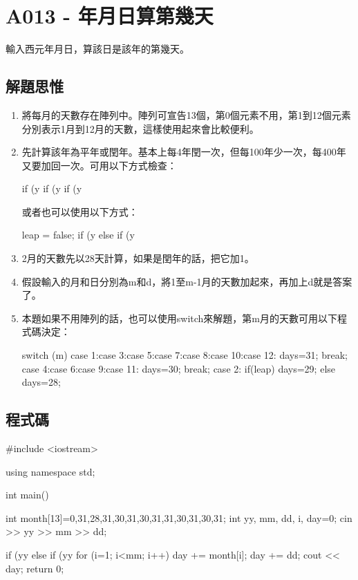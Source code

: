 \section{A013 - 年月日算第幾天}
輸入西元年月日，算該日是該年的第幾天。

\subsection{解題思惟}
\begin{enumerate}
	\item 將每月的天數存在陣列中。陣列可宣告13個，第0個元素不用，第1到12個元素分別表示1月到12月的天數，這樣使用起來會比較便利。
	\item 先計算該年為平年或閏年。基本上每4年閏一次，但每100年少一次，每400年又要加回一次。可用以下方式檢查：
	\begin{inside}
	if (y%
	if (y%
	if (y%
	\end{inside}
	或者也可以使用以下方式：
	\begin{inside}
	leap = false;
	if (y%
	else if (y%
	\end{inside}
	\item 2月的天數先以28天計算，如果是閏年的話，把它加1。
	\item 假設輸入的月和日分別為m和d，將1至m-1月的天數加起來，再加上d就是答案了。
	\item 本題如果不用陣列的話，也可以使用switch來解題，第m月的天數可用以下程式碼決定：
	\begin{inside}
	switch (m) {
	case 1:case 3:case 5:case 7:case 8:case 10:case 12: days=31; break;
	case 4:case 6:case 9:case 11: days=30; break;
	case 2: if(leap) days=29; else days=28;
	}
	\end{inside}
\end{enumerate}

\subsection{程式碼}
\begin{cppcode}
#include <iostream>

using namespace std;

int main()
{
	int month[13]={0,31,28,31,30,31,30,31,31,30,31,30,31};
	int yy, mm, dd, i, day=0;
	cin >> yy >> mm >> dd;
	
	if (yy%
	else if (yy%
	for (i=1; i<mm; i++) day += month[i];
	day += dd;
	cout << day;
	return 0;
}
\end{cppcode}
